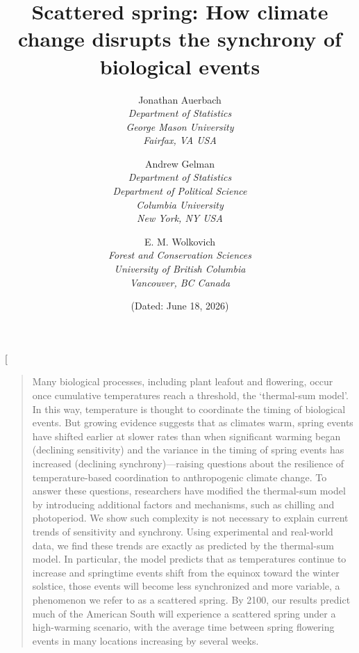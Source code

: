 \documentclass[
]{article}
\title{\textbf{Scattered spring: How climate change disrupts the synchrony of biological events }\\[1em]}
\author{
Jonathan Auerbach\footnotemark[1]\\
\textit{Department of Statistics} \\ 
\textit{George Mason University}\\
\textit{Fairfax, VA USA}\\
\and
Andrew Gelman\footnotemark[2]\\
\textit{Department of Statistics} \\ 
\textit{Department of Political Science}\\
\textit{Columbia University} \\
\textit{New York, NY USA}\\
\and
E. M. Wolkovich\footnotemark[3]\\
\textit{Forest and Conservation Sciences} \\
\textit{University of British Columbia}\\
\textit{Vancouver, BC Canada} \\[1em]
}
\date{(Dated: June 18, 2026)}
\begin{document}
\twocolumn[
\maketitle

\begin{quote} %
Many biological processes, including plant leafout and flowering, occur once cumulative temperatures reach a threshold, the `thermal-sum model'. In this way, temperature is thought to coordinate the timing of biological events. But growing evidence suggests that 
as climates warm, spring events have shifted earlier at slower rates than when significant warming began (declining sensitivity) and the variance in the timing of spring events has increased (declining synchrony)---raising questions about the resilience of temperature-based coordination to anthropogenic climate change. To answer these questions, researchers have modified the thermal-sum model by introducing additional factors and mechanisms, such as chilling and photoperiod. We show such complexity is not necessary to explain current trends of sensitivity and synchrony. Using experimental and real-world data, we find these trends are exactly as predicted by the thermal-sum model. In particular, the model predicts that as temperatures continue to increase and springtime events shift from the equinox toward the winter solstice, those events will become less synchronized and more variable, a phenomenon we refer to as a scattered spring. By 2100, our results predict much of the American South will experience a scattered spring under a high-warming scenario, with the average time between spring flowering events in many locations increasing by several weeks.
\end{quote}
\end{document}
